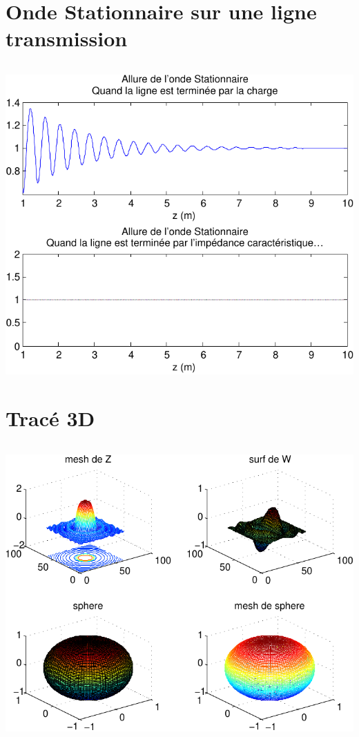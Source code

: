 \documentclass[10pt]{article}
\begin{document}
 \section{Onde Stationnaire sur une ligne transmission}
  \inputminted[linenos]{matlab}{OndeStationnaire.m}
  \begin{center}
   \includegraphics{OndeStationnaire}
  \end{center}
  \newpage

 \section{Tracé 3D}
  \inputminted[linenos]{matlab}{troisD.m}
  \begin{center}
   \includegraphics{TroisD}
  \end{center}
  \newpage
\end{document}
